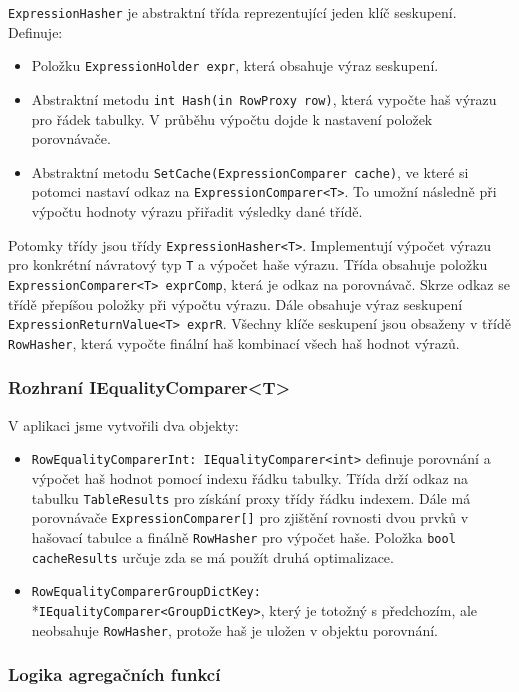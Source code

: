 \texttt{ExpressionHasher} je abstraktní třída reprezentující jeden klíč seskupení.
Definuje:
\begin{itemize}
\item Položku \texttt{ExpressionHolder expr}, která obsahuje výraz seskupení.
\item Abstraktní metodu \texttt{int Hash(in RowProxy row)}, která vypočte haš výrazu pro řádek tabulky. 
V průběhu výpočtu dojde k nastavení položek porovnávače.
\item Abstraktní metodu \texttt{SetCache(ExpressionComparer cache)}, ve které si potomci nastaví odkaz na \texttt{ExpressionComparer<T>}.
To umožní následně při výpočtu hodnoty výrazu přiřadit výsledky dané třídě.
\end{itemize}
Potomky třídy jsou třídy \texttt{ExpressionHasher<T>}.
Implementují výpočet výrazu pro konkrétní návratový typ \texttt{T} a výpočet haše výrazu.
Třída obsahuje položku \texttt{ExpressionComparer<T> exprComp}, která je odkaz na porovnávač. 
Skrze odkaz se třídě přepíšou položky při výpočtu výrazu.
Dále obsahuje výraz seskupení \texttt{ExpressionReturnValue<T> exprR}.
Všechny klíče seskupení jsou obsaženy v třídě \texttt{RowHasher}, která vypočte finální haš kombinací všech haš hodnot výrazů. 

\subsubsection{Rozhraní IEqualityComparer<T>}

V aplikaci jsme vytvořili dva objekty:
\begin{itemize}
\item \texttt{RowEqualityComparerInt: IEqualityComparer<int>} definuje porovnání a výpočet haš hodnot pomocí indexu řádku tabulky.
Třída drží odkaz na tabulku \texttt{TableResults} pro získání proxy třídy řádku indexem.
Dále má porovnávače \texttt{ExpressionComparer[]} pro zjištění rovnosti dvou prvků v hašovací tabulce a finálně \texttt{RowHasher} pro výpočet haše.
Položka \texttt{bool cacheResults} určuje zda se má použít druhá optimalizace.
\item \texttt{RowEqualityComparerGroupDictKey:} \\*\texttt{IEqualityComparer<GroupDictKey>}, který je totožný s předchozím, ale neobsahuje \texttt{RowHasher}, protože haš je uložen v objektu porovnání.
\end{itemize}

\subsubsection{Logika agregačních funkcí}

